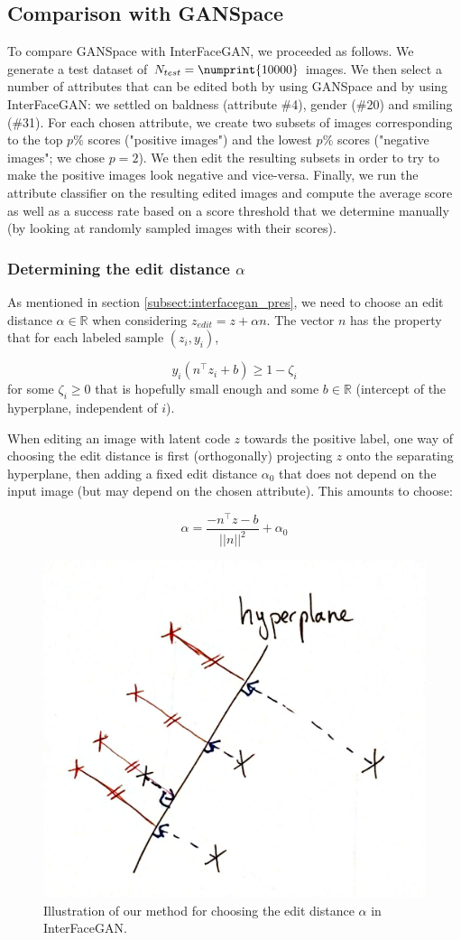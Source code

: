 \documentclass[a4paper]{article}
\begin{document}
\subsection{Comparison with GANSpace}

To compare GANSpace with InterFaceGAN, we proceeded as follows. We generate a test dataset of $N_{test} = \numprint{10000}$ images. We then select a number of attributes that can be edited both by using GANSpace and by using InterFaceGAN: we settled on baldness (attribute \#4), gender (\#20) and smiling (\#31). For each chosen attribute, we create two subsets of images corresponding to the top $p\%$ scores ("positive images") and the lowest $p\%$ scores ("negative images"; we chose $p = 2$). We then edit the resulting subsets in order to try to make the positive images look negative and vice-versa. Finally, we run the attribute classifier on the resulting edited images and compute the average score as well as a success rate based on a score threshold that we determine manually (by looking at randomly sampled images with their scores).

\subsubsection*{Determining the edit distance $\alpha$}

As mentioned in section \ref{subsect:interfacegan_pres}, we need to choose an edit distance $\alpha \in \mathbb{R}$ when considering $z_{edit} = z + \alpha n$. The vector $n$ has the property that for each labeled sample $(z_i, y_i)$,

$$ y_i(n^\top z_i + b) \geq 1-\zeta_i $$ for some $\zeta_i \geq 0$ that is hopefully small enough and some $b \in \mathbb{R}$ (intercept of the hyperplane, independent of $i$).

When editing an image with latent code $z$ towards the positive label, one way of choosing the edit distance is first (orthogonally) projecting $z$ onto the separating hyperplane, then adding a fixed edit distance $\alpha_0$ that does not depend on the input image (but may depend on the chosen attribute). This amounts to choose:

$$ \alpha = \frac{-n^\top z - b}{||n||^2} + \alpha_0 $$

\begin{figure}[hbt!]
    \centering
    \includegraphics[width=.4\textwidth]{fig/Hyperplane.jpg}
    \caption{Illustration of our method for choosing the edit distance $\alpha$ in InterFaceGAN.}
    \label{fig:hyperplane}
\end{figure}
\end{document}
